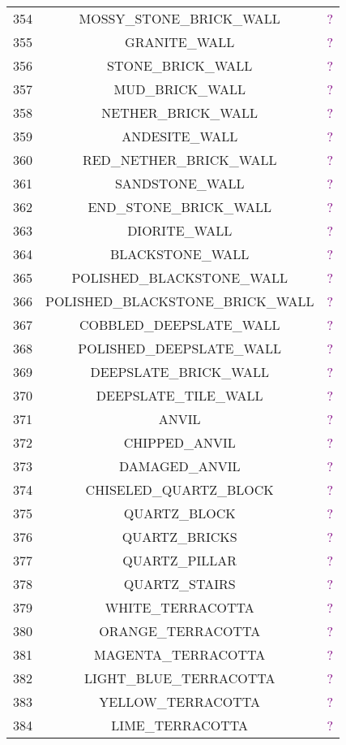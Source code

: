 \documentclass[11pt]{article}
\newcommand\myworries[1]{\textcolor{purple}{#1}}
\begin{document}
\begin{longtable}{ |c|c|c| }
	354 & MOSSY\_STONE\_BRICK\_WALL & \myworries{?} \\
	355 & GRANITE\_WALL & \myworries{?} \\
	356 & STONE\_BRICK\_WALL & \myworries{?} \\
	357 & MUD\_BRICK\_WALL & \myworries{?} \\
	358 & NETHER\_BRICK\_WALL & \myworries{?} \\
	359 & ANDESITE\_WALL & \myworries{?} \\
	360 & RED\_NETHER\_BRICK\_WALL & \myworries{?} \\
	361 & SANDSTONE\_WALL & \myworries{?} \\
	362 & END\_STONE\_BRICK\_WALL & \myworries{?} \\
	363 & DIORITE\_WALL & \myworries{?} \\
	364 & BLACKSTONE\_WALL & \myworries{?} \\
	365 & POLISHED\_BLACKSTONE\_WALL & \myworries{?} \\
	366 & POLISHED\_BLACKSTONE\_BRICK\_WALL & \myworries{?} \\
	367 & COBBLED\_DEEPSLATE\_WALL & \myworries{?} \\
	368 & POLISHED\_DEEPSLATE\_WALL & \myworries{?} \\
	369 & DEEPSLATE\_BRICK\_WALL & \myworries{?} \\
	370 & DEEPSLATE\_TILE\_WALL & \myworries{?} \\
	371 & ANVIL & \myworries{?} \\
	372 & CHIPPED\_ANVIL & \myworries{?} \\
	373 & DAMAGED\_ANVIL & \myworries{?} \\
	374 & CHISELED\_QUARTZ\_BLOCK & \myworries{?} \\
	375 & QUARTZ\_BLOCK & \myworries{?} \\
	376 & QUARTZ\_BRICKS & \myworries{?} \\
	377 & QUARTZ\_PILLAR & \myworries{?} \\
	378 & QUARTZ\_STAIRS & \myworries{?} \\
	379 & WHITE\_TERRACOTTA & \myworries{?} \\
	380 & ORANGE\_TERRACOTTA & \myworries{?} \\
	381 & MAGENTA\_TERRACOTTA & \myworries{?} \\
	382 & LIGHT\_BLUE\_TERRACOTTA & \myworries{?} \\
	383 & YELLOW\_TERRACOTTA & \myworries{?} \\
	384 & LIME\_TERRACOTTA & \myworries{?} \\

\end{longtable}
\end{document}
